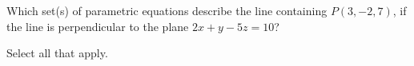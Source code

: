\documentclass{ximera}
\author{}
\begin{document}
\begin{exercise}
Which set(s) of parametric equations describe the line containing $P(3, -2, 7)$, if the line is perpendicular to the plane $2x+y-5z=10$? 

Select all that apply.

\begin{selectAll}
   \end{selectAll}
 
\end{exercise}
\end{document}
